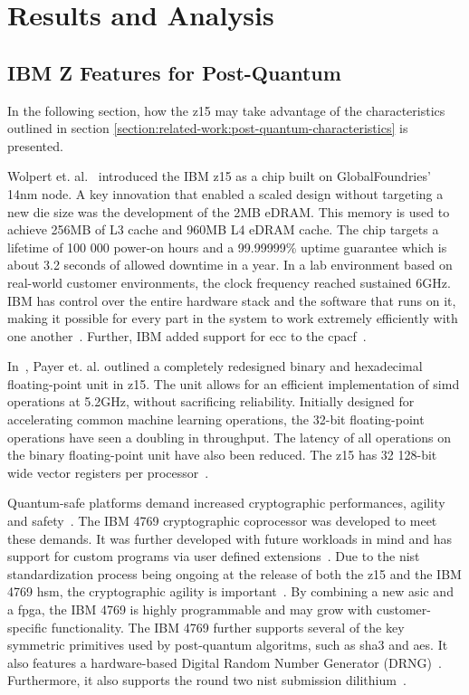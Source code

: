 \chapter{Results and Analysis}
\label{chapter:results}

\section{IBM Z Features for Post-Quantum}
\label{section:results:z15}

In the following section, how the \gls{z15} may take advantage of the characteristics outlined in section \ref{section:related-work:post-quantum-characteristics} is presented.

Wolpert et. al.~\cite{wolpert2020} introduced the IBM \gls{z15} as a chip built on GlobalFoundries' 14nm node. A key innovation that enabled a scaled design without targeting a new die size was the development of the 2MB eDRAM. This memory is used to achieve 256MB of L3 cache and 960MB L4 eDRAM cache. The chip targets a lifetime of 100 000 power-on hours and a 99.99999\% uptime guarantee which is about 3.2 seconds of allowed downtime in a year. In a lab environment based on real-world customer environments, the clock frequency reached sustained 6GHz. IBM has control over the entire hardware stack and the software that runs on it, making it possible for every part in the system to work extremely efficiently with one another~\cite{wolpert2020}. Further, IBM added support for \gls{ecc} to the \gls{cpacf}~\cite{berry2020}.

In~\cite{payer2020}, Payer et. al. outlined a completely redesigned binary and hexadecimal floating-point unit in \gls{z15}. The unit allows for an efficient implementation of \gls{simd} operations at 5.2GHz, without sacrificing reliability. Initially designed for accelerating common machine learning operations, the 32-bit floating-point operations have seen a doubling in throughput. The latency of all operations on the binary floating-point unit have also been reduced. The \gls{z15} has 32 128-bit wide vector registers per processor~\cite{redbook:z15}.

Quantum-safe platforms demand increased cryptographic performances, agility and safety~\cite{busby2020}. The IBM 4769 cryptographic coprocessor was developed to meet these demands. It was further developed with future workloads in mind and has support for custom programs via user defined extensions~\cite{busby2020, ibm:4769}. Due to the \gls{nist} standardization process being ongoing at the release of both the \gls{z15} and the IBM 4769 \gls{hsm}, the cryptographic agility is important~\cite{microsoft2020, ibm:z15:2019}. By combining a new \gls{asic} and a \gls{fpga}, the IBM 4769 is highly programmable and may grow with customer-specific functionality. The IBM 4769 further supports several of the key symmetric primitives used by \gls{post-quantum} algoritms, such as \gls{sha3} and \gls{aes}. It also features a hardware-based Digital Random Number Generator (DRNG)~\cite{ibm:4769:ep11}. Furthermore, it also supports the round two \gls{nist} submission \gls{dilithium}~\cite{ibm:4769:ep11, busby2020}.

